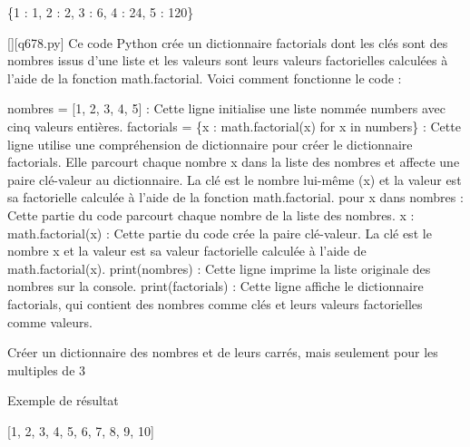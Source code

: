 \{1 : 1, 2 : 2, 3 : 6, 4 : 24, 5 : 120\}
        \par
        \begin{solution}
            \renewcommand{\nomfichier}{q678.py}
            \pythonfile{\chemincode \nomfichier}[][\nomfichier]
            Ce code Python crée un dictionnaire factorials dont les clés sont des nombres issus d'une liste et les valeurs sont leurs valeurs factorielles calculées à l'aide de la fonction math.factorial. Voici comment fonctionne le code :

    nombres = [1, 2, 3, 4, 5] : Cette ligne initialise une liste nommée numbers avec cinq valeurs entières.
    factorials = \{x : math.factorial(x) for x in numbers\} : Cette ligne utilise une compréhension de dictionnaire pour créer le dictionnaire factorials. Elle parcourt chaque nombre x dans la liste des nombres et affecte une paire clé-valeur au dictionnaire. La clé est le nombre lui-même (x) et la valeur est sa factorielle calculée à l'aide de la fonction math.factorial.
        pour x dans nombres : Cette partie du code parcourt chaque nombre de la liste des nombres.
        x : math.factorial(x) : Cette partie du code crée la paire clé-valeur. La clé est le nombre x et la valeur est sa valeur factorielle calculée à l'aide de math.factorial(x).
    print(nombres) : Cette ligne imprime la liste originale des nombres sur la console.
    print(factorials) : Cette ligne affiche le dictionnaire factorials, qui contient des nombres comme clés et leurs valeurs factorielles comme valeurs.
        \end{solution}
        

        \question
        Créer un dictionnaire des nombres et de leurs carrés, mais seulement pour les multiples de 3

Exemple de résultat

[1, 2, 3, 4, 5, 6, 7, 8, 9, 10]

